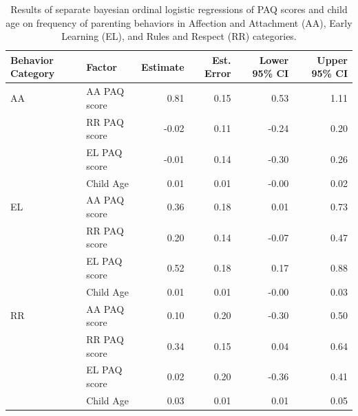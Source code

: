 \documentclass[man]{apa6}
\theoremstyle{definition}
\theoremstyle{definition}
\theoremstyle{definition}
\theoremstyle{remark}
\begin{document}
\begin{table}[h]
\centering
\caption{Results of separate bayesian ordinal logistic regressions of PAQ scores and child age on frequency of parenting behaviors in Affection and Attachment (AA), Early Learning (EL), and Rules and Respect (RR) categories.} 
\label{tab:behavetab}
\begin{tabular}{llrrrr}
  \hline
Behavior Category & Factor & Estimate & Est. Error & Lower 95\% CI & Upper 95\% CI \\ 
  \hline
AA & AA PAQ score & 0.81 & 0.15 & 0.53 & 1.11 \\ 
   & RR PAQ score & -0.02 & 0.11 & -0.24 & 0.20 \\ 
   & EL PAQ score & -0.01 & 0.14 & -0.30 & 0.26 \\ 
   & Child Age & 0.01 & 0.01 & -0.00 & 0.02 \\ 
   \hline
EL & AA PAQ score & 0.36 & 0.18 & 0.01 & 0.73 \\ 
   & RR PAQ score & 0.20 & 0.14 & -0.07 & 0.47 \\ 
   & EL PAQ score & 0.52 & 0.18 & 0.17 & 0.88 \\ 
   & Child Age & 0.01 & 0.01 & -0.00 & 0.03 \\ 
   \hline
RR & AA PAQ score & 0.10 & 0.20 & -0.30 & 0.50 \\ 
   & RR PAQ score & 0.34 & 0.15 & 0.04 & 0.64 \\ 
   & EL PAQ score & 0.02 & 0.20 & -0.36 & 0.41 \\ 
   & Child Age & 0.03 & 0.01 & 0.01 & 0.05 \\ 
   \hline
\end{tabular}
\end{table}
\end{document}

